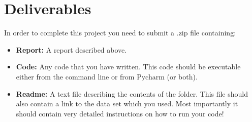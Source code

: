 \documentclass[11pt, leqno, a4paper]{article}
\begin{document}
\section{Deliverables}

In order to complete this project you need to submit a .zip file containing:
\begin{itemize}
\item \textbf{Report:} A report described above.
\item \textbf{Code:} Any code that you have written. This code should be executable either from the command line or from Pycharm (or both).
\item \textbf{Readme:} A text file describing the contents of the folder. This file should also contain a link to the data set which you used. Most importantly
it should contain very detailed instructions on how to run your code!
\end{itemize}
\end{document}
